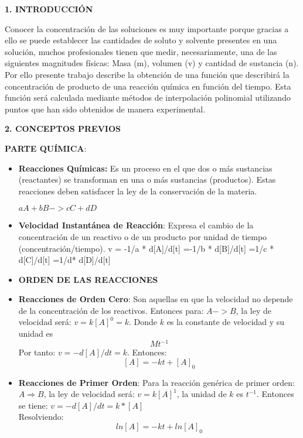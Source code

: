 \documentclass[10pt,a4paper]{article}
\begin{document}
\begin{multicols}{2}
\begin{center}
{\large \bf 1. INTRODUCCI\'ON}
\end{center}
Conocer la concentración de las soluciones es muy importante porque gracias a ello se puede establecer las cantidades de soluto y solvente presentes en una solución, muchos profesionales tienen que medir, necesariamente, una de las siguientes magnitudes físicas: Masa (m), volumen (v) y cantidad de sustancia (n). \\
 
Por ello presente trabajo describe la obtención de una función que describirá la concentración de producto de una reacción química en función del tiempo. Esta función será calculada mediante métodos de interpolación polinomial utilizando puntos que han sido obtenidos de manera experimental.

\begin{center}
{\large \bf 2. CONCEPTOS PREVIOS}
\end{center}
\noindent \textbf{PARTE QUÍMICA}:

\begin{itemize}

	\item \textbf{Reacciones Químicas:} Es un proceso en el que dos o más sustancias (reactantes) se transforman en una o más sustancias (productos). Estas reacciones deben satisfacer la ley de la conservación de la materia.
    \begin{center}
		$aA  +  bB  ->  cC  +  dD$
    \end{center}
	\item \textbf{Velocidad Instantánea de Reacción}: Expresa el cambio de la concentración de un reactivo o de un producto por unidad de tiempo (concentración/tiempo).
	{\scriptsize
	         v = -1/a * d[A]/d[t] =-1/b * d[B]/d[t] =1/c * d[C]/d[t] =1/d* d[D]/d[t] 
	}

	\item \textbf{ORDEN DE LAS REACCIONES}
	\item \textbf{Reacciones de Orden Cero}: Son aquellas en que la velocidad no depende de la concentración de los reactivos. Entonces para: $A -> B$, la ley de velocidad será: $v=k[A]^0=k$. Donde $k$ es la constante de velocidad y su unidad es \[Mt^{-1}\] Por tanto:
	$v=-d[A]/dt=k$.
	Entonces:  \[[A]=-kt+[A]_0\]

	\item \textbf{Reacciones de Primer Orden}: Para la reacción genérica de primer orden: $A \Rightarrow B$, la ley de velocidad será: $v=k[A]^1$, la unidad de $k$ es $t^{-1}$. Entonces se tiene:
	$v=-d[A]/dt=k*[A]$\\
	Resolviendo:   \[ln[A]=-kt+ ln[A]_0\]
	

\end{itemize}
\end{multicols}
\end{document}
